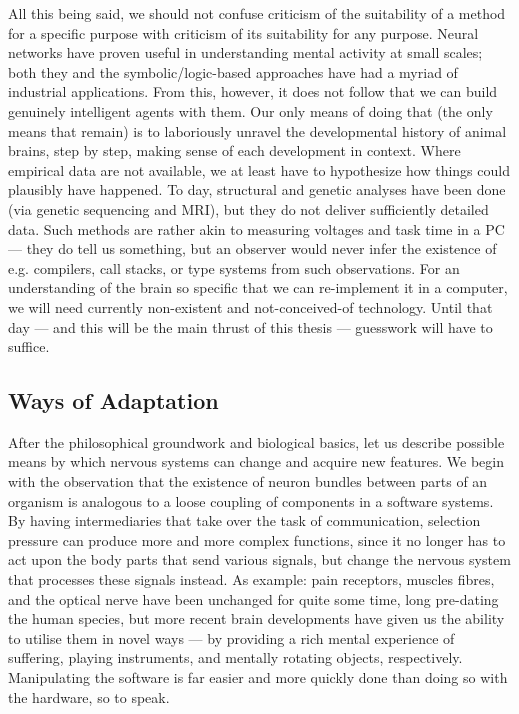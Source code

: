 All this being said, we should not confuse criticism of the suitability of a method for a specific purpose with criticism of its suitability for any purpose. Neural networks have proven useful in understanding mental activity at small scales; both they and the symbolic/logic-based approaches have had a myriad of industrial applications. From this, however, it does not follow that we can build genuinely intelligent agents with them. Our only means of doing that (the only means that remain) is to laboriously unravel the developmental history of animal brains, step by step, making sense of each development in context. Where empirical data are not available, we at least have to hypothesize how things could plausibly have happened. To day, structural and genetic analyses have been done (via genetic sequencing and MRI), but they do not deliver sufficiently detailed data. Such methods are rather akin to measuring voltages and task time in a PC --- they do tell us something, but an observer would never infer the existence of e.g. compilers, call stacks, or type systems from such observations. For an understanding of the brain so specific that we can re-implement it in a computer, we will need currently non-existent and not-conceived-of technology. Until that day --- and this will be the main thrust of this thesis --- guesswork will have to suffice.

\subsection{Ways of Adaptation}

After the philosophical groundwork and biological basics, let us describe possible means by which nervous systems can change and acquire new features. We begin with the observation that the existence of neuron bundles between parts of an organism is analogous to a loose coupling of components in a software systems. By having intermediaries that take over the task of communication, selection pressure can produce more and more complex functions, since it no longer has to act upon the body parts that send various signals, but change the nervous system that processes these signals instead. As example: pain receptors, muscles fibres, and the optical nerve have been unchanged for quite some time, long pre-dating the human species, but more recent brain developments have given us the ability to utilise them in novel ways --- by providing a rich mental experience of suffering, playing instruments, and mentally rotating objects, respectively. Manipulating the software is far easier and more quickly done than doing so with the hardware, so to speak.

